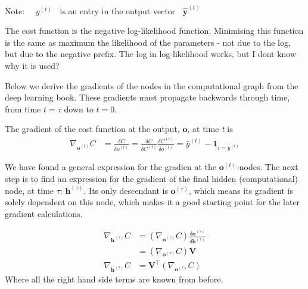 \documentclass[12pt]{article}
\begin{document}
Note: $\quad y^{(t)} \;\;$ is an entry in the output vector $\;\; \mathbf{\hat{y}}^{(t)}$ \par
The cost function is the negative log-likelihood function. Minimising this function is the same as maximum the likelihood of the parameters - not due to the log, but due to the negative prefix. The log in log-likelihood works, but I dont know why it is used? \par
Below we derive the gradients of the nodes in the computational graph from the deep learning book. These gradients must propagate backwards through time, from time $t=\tau$ down to $t=0$.
\par
The gradient of the cost function at the output, $\mathbf{o}$, at time \textit{t} is
\begin{align}
    \nabla_{\mathbf{o}^{(t)}} C &= \frac{\delta C}{\delta o^{(t)}}
    = \frac{\delta C}{\delta C^{(t)}}\frac{\delta C^{(t)}}{\delta o^{(t)}}
    = \hat{y}^{(t)} - \mathbf{1}_{i=y^{(t)}}
\end{align}

We have found a general expression for the gradien at the $\mathbf{o}^{(t)}$-nodes. The next step is to find an expression for the gradient of the final hidden (computational) node, at time $\tau$: $\mathbf{h}^{(\tau)}$. Its only descendant is $\mathbf{o}^{(\tau)}$, which means its gradient is solely dependent on this node, which makes it a good starting point for the later gradient calculations.

\begin{align}
    \nabla_{\mathbf{h}^{(\tau)}} C &= \left(\nabla_{\mathbf{o}^{(\tau)}}C\right) \frac{\delta \mathbf{o}^{(\tau)}}{\delta \mathbf{h}^{(\tau)}}\\
    &= \left(\nabla_{\mathbf{o}^{(\tau)}}C\right) \mathbf{V}\\
    \nabla_{\mathbf{h}^{(\tau)}} C &= \mathbf{V}^{\top} \left(\nabla_{\mathbf{o}^{(\tau)}}C\right)
\end{align}
Where all the right hand side terms are known from before. \par
\end{document}
